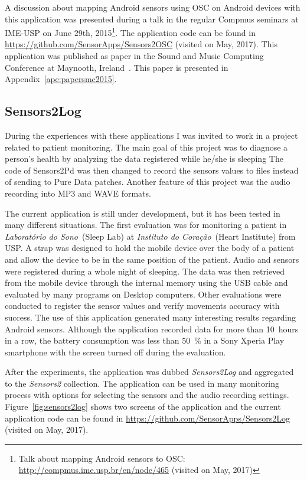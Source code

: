 A discussion about mapping Android sensors using OSC on Android devices with this application was presented during a talk in the regular Compmus seminars at IME-USP on June 29th, 2015\footnote{Talk about mapping Android sensors to OSC: \url{http://compmus.ime.usp.br/en/node/465} (visited on May, 2017)}.
The application code can be found in \url{https://github.com/SensorApps/Sensors2OSC} (visited on May, 2017).
This application was published as paper in the Sound and Music Computing Conference at Maynooth, Ireland~\citep{deCarvalhoJunior2015sensors2osc}.
This paper is presented in Appendix~\ref{ape:papersmc2015}.

\subsection*{Sensors2Log}
\label{apesubsec:appsensors2log}

During the experiences with these applications I was invited to work in a project related to patient monitoring. %
The main goal of this project was to diagnose a person's health by analyzing the data registered while he/she is sleeping
The code of Sensors2Pd was then changed to record the sensors values to files instead of sending to Pure Data patches.
Another feature of this project was the audio recording into MP3 and WAVE formats.

The current application is still under development, but it has been tested in many different situations.
The first evaluation was for monitoring a patient in \textit{Laboratório do Sono}~(Sleep Lab) at \textit{Instituto do Coração}~(Heart Institute) from USP.
A strap was designed to hold the mobile device over the body of a patient and allow the device to be in the same position of the patient.
Audio and sensors were registered during a whole night of sleeping.
The data was then retrieved from the mobile device through the internal memory using the USB cable and evaluated by many programs on Desktop computers.
Other evaluations were conducted to register the sensor values and verify movements accuracy with success.
The use of this application generated many interesting results regarding Android sensors.
Although the application recorded data for more than 10~hours in a row, the battery consumption was less than 50~\% in a Sony Xperia Play smartphone with the screen turned off during the evaluation.

After the experiments, the application was dubbed \textit{Sensors2Log} and aggregated to the \textit{Sensors2} collection.
The application can be used in many monitoring process with options for selecting the sensors and the audio recording settings.
Figure~\ref{fig:sensors2log} shows two screens of the application and the current application code can be found in \url{https://github.com/SensorApps/Sensors2Log} (visited on May, 2017).

